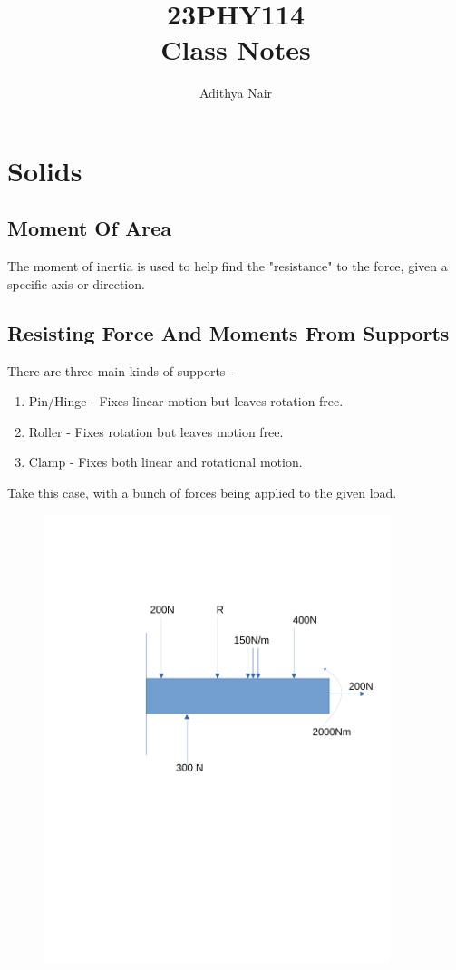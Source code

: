 \documentclass{report}
\title{\Huge{23PHY114}\\ Class Notes}
\author{\huge{Adithya Nair}}
\date{}
\begin{document}
\maketitle
\newpage%
\tableofcontents
\chapter{Solids}
\section{Moment Of Area}
The moment of inertia is used to help find the "resistance" to the force, given a specific axis or direction.

\section{Resisting Force And Moments From Supports} %
\label{sec:resisting_force_and_moments_from_supports}
There are three main kinds of supports - 
\begin{enumerate}
  \item Pin/Hinge - Fixes linear motion but leaves rotation free. 
  \item Roller - Fixes rotation but leaves motion free. 
  \item Clamp - Fixes both linear and rotational motion.
\end{enumerate}
Take this case, with a bunch of forces being applied to the given load. 
\begin{figure}[ht]
    \includegraphics[width=0.9\textwidth]{figures/ProblemExample1.pdf}
\end{figure}
\end{document}
